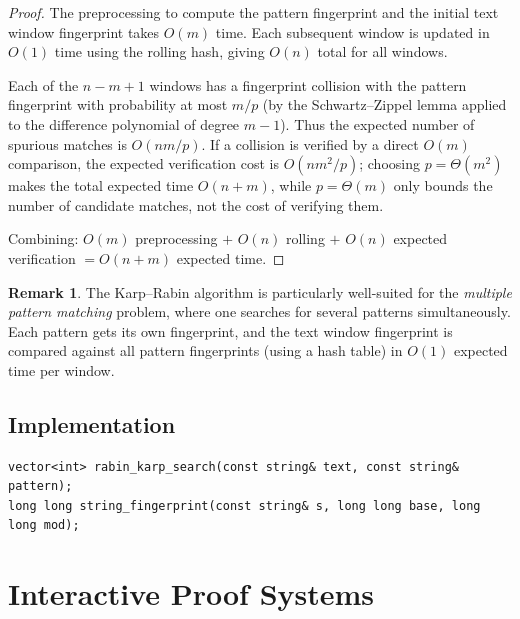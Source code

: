 \documentclass[twoside,12pt]{book}
\theoremstyle{plain}
\theoremstyle{definition}
\newtheorem{remark}[theorem]{Remark}
\theoremstyle{remark}
\newenvironment{cpplisting}{\begin{center}\small}{\end{center}}
\begin{document}
\begin{proof}
The preprocessing to compute the pattern fingerprint and the initial text window fingerprint takes $O(m)$ time. Each subsequent window is updated in $O(1)$ time using the rolling hash, giving $O(n)$ total for all windows.

Each of the $n - m + 1$ windows has a fingerprint collision with the pattern
fingerprint with probability at most $m/p$ (by the Schwartz--Zippel lemma
applied to the difference polynomial of degree $m-1$). Thus the expected
number of spurious matches is $O(nm/p)$. If a collision is verified by a
direct $O(m)$ comparison, the expected verification cost is $O(nm^2/p)$;
choosing $p=\Theta(m^2)$ makes the total expected time $O(n+m)$, while
$p=\Theta(m)$ only bounds the number of candidate matches, not the cost of
verifying them.

Combining: $O(m)$ preprocessing $+$ $O(n)$ rolling $+$ $O(n)$ expected verification $= O(n + m)$ expected time.
\end{proof}

\begin{remark}
The Karp--Rabin algorithm is particularly well-suited for the \emph{multiple pattern matching} problem, where one searches for several patterns simultaneously. Each pattern gets its own fingerprint, and the text window fingerprint is compared against all pattern fingerprints (using a hash table) in $O(1)$ expected time per window.
\end{remark}

\subsection*{Implementation}

\begin{cpplisting}
\begin{lstlisting}[title={Rabin--Karp search --- \texttt{src/chapter8/rabin\_karp.h}}]
vector<int> rabin_karp_search(const string& text, const string& pattern);
long long string_fingerprint(const string& s, long long base, long long mod);
\end{lstlisting}
\end{cpplisting}


\section{Interactive Proof Systems}
\label{sec:interactive-proofs}
\end{document}
